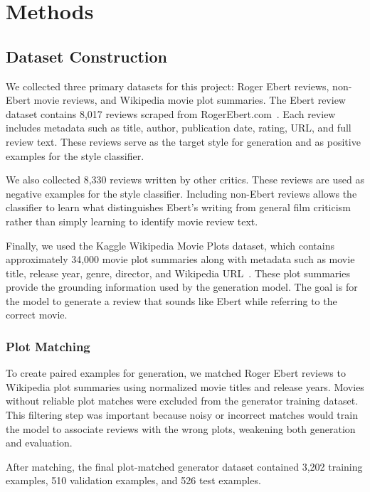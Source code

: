 \section{Methods}

\subsection{Dataset Construction}

We collected three primary datasets for this project: Roger Ebert reviews, non-Ebert movie reviews, and Wikipedia movie plot summaries. The Ebert review dataset contains 8,017 reviews scraped from RogerEbert.com~\cite{ebert}. Each review includes metadata such as title, author, publication date, rating, URL, and full review text. These reviews serve as the target style for generation and as positive examples for the style classifier.

We also collected 8,330 reviews written by other critics. These reviews are used as negative examples for the style classifier. Including non-Ebert reviews allows the classifier to learn what distinguishes Ebert's writing from general film criticism rather than simply learning to identify movie review text.

Finally, we used the Kaggle Wikipedia Movie Plots dataset, which contains approximately 34,000 movie plot summaries along with metadata such as movie title, release year, genre, director, and Wikipedia URL~\cite{kaggle}. These plot summaries provide the grounding information used by the generation model. The goal is for the model to generate a review that sounds like Ebert while referring to the correct movie.

\subsubsection{Plot Matching}

To create paired examples for generation, we matched Roger Ebert reviews to Wikipedia plot summaries using normalized movie titles and release years. Movies without reliable plot matches were excluded from the generator training dataset. This filtering step was important because noisy or incorrect matches would train the model to associate reviews with the wrong plots, weakening both generation and evaluation.

After matching, the final plot-matched generator dataset contained 3,202 training examples, 510 validation examples, and 526 test examples.

